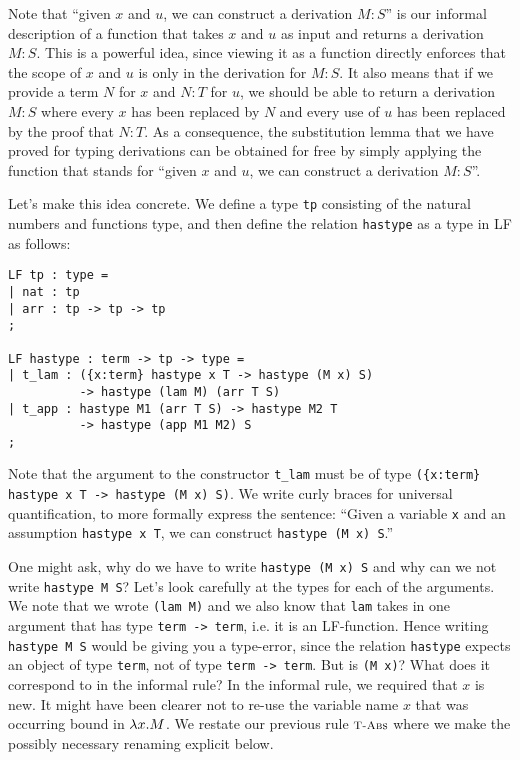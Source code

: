Note that ``given $x$ and $u$, we can construct a derivation $M:S$'' is our
informal description of a function that takes $x$ and $u$ as input and returns a
derivation $M:S$. This is a powerful idea, since viewing it as a function
directly enforces that the scope of $x$ and $u$ is only in the derivation for
$M:S$. It also means that if we provide a term $N$ for $x$ and $N:T$ for $u$, we
should be able to return a derivation $M:S$ where every $x$ has been replaced
by $N$ and every use of $u$ has been replaced by the proof that $N:T$. As a
consequence, the substitution lemma that we have proved for typing derivations
can be obtained for free by simply applying the function that stands for ``given
$x$ and $u$, we can construct a derivation $M:S$''.


Let's make this idea concrete. We define a type \lstinline!tp! consisting of the
natural numbers and functions type, and then define the relation \lstinline!hastype! as
a type in LF as follows:

\begin{lstlisting}
LF tp : type = 
| nat : tp
| arr : tp -> tp -> tp
;

LF hastype : term -> tp -> type =
| t_lam : ({x:term} hastype x T -> hastype (M x) S)
          -> hastype (lam M) (arr T S)
| t_app : hastype M1 (arr T S) -> hastype M2 T
          -> hastype (app M1 M2) S
;
\end{lstlisting}

Note that the argument to the constructor \lstinline!t_lam! must be of type
\lstinline!({x:term} hastype x T -> hastype (M x) S)!. We write curly braces
for universal quantification, to more formally express the sentence:
``Given a variable \lstinline!x! and an assumption \lstinline!hastype x T!, we can
construct \lstinline!hastype (M x) S!.''

One might ask, why do we have to write \lstinline!hastype (M x) S! and why can
we not write \lstinline!hastype M S!? Let's look carefully at the types for
each of the arguments. We note that we wrote \lstinline!(lam M)! and we also
know that \lstinline!lam! takes in one argument that has type
\lstinline!term -> term!, i.e. it is an LF-function. Hence writing \lstinline!hastype M S! would be
giving you a type-error, since the relation \lstinline!hastype! expects an
object of type \lstinline!term!, not of type \lstinline!term -> term!.
But is \lstinline!(M x)!? What does it correspond to in the informal rule? In the
informal rule, we required that $x$ is new. It might have been clearer not to
re-use the variable name $x$ that was occurring bound in $\lambda
x.M$. We restate our previous rule $\textsc{\footnotesize T-Abs}$ where we make the possibly necessary
renaming explicit below.

